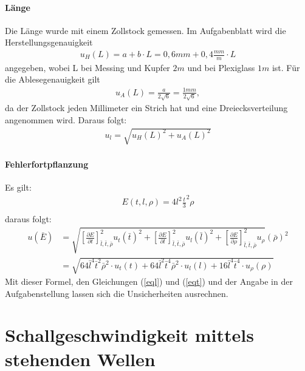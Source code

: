\documentclass[11pt, a4paper]{article}
\begin{document}
    \paragraph{Länge}
    Die Länge wurde mit einem Zollstock gemessen. Im Aufgabenblatt wird die Herstellungsgenauigkeit
    \begin{align}
        u_H(L) = a+b \cdot L = 0,6mm + 0,4\frac{mm}{m} \cdot L
    \end{align}
    angegeben, wobei L bei Messing und Kupfer $2m$ und bei Plexiglass $1m$ ist.
    Für die Ablesegenauigkeit gilt
    \begin{align}
        u_A(L) = \frac{a}{2\sqrt{6}} = \frac{1mm}{2\sqrt{6}},
    \end{align}
    da der Zollstock jeden Millimeter ein Strich hat und eine Dreiecksverteilung angenommen wird.
    Daraus folgt:
    \begin{align} \label{eql}
        u_l = \sqrt{u_H(L)^2 + u_A(L)^2}
    \end{align}

    \paragraph{Fehlerfortpflanzung}
    Es gilt:
    \begin{align}
        E(t, l, \rho ) = 4l^2 \frac{t}{3}^2 \rho \\
    \end{align}
    daraus folgt:
    \begin{align}
        u(\bar{E}) &= \sqrt{\left[\frac{\partial E}{\partial t}\right]^2_{\bar{l}, \bar{t}, \bar{\rho}} u_{t}(\bar{t})^2 +
        \left[\frac{\partial E}{\partial l}\right]^2_{\bar{l}, \bar{t}, \bar{\rho}} u_{l}(\bar{l})^2 +
        \left[\frac{\partial E}{\partial \rho}\right]^2_{\bar{l}, \bar{t}, \bar{\rho}} u_{\rho}}(\bar{\rho})^2 \nonumber \\
        &= \sqrt{64 \bar{l}^4\bar{t}^2 \bar{\rho}^2 \cdot u_t(t) +
        64 \bar{l}^2 \bar{t}^4 \bar{\rho}^2 \cdot u_l(l) +
        16 \bar{l}^4\bar{t}^4 \cdot u_{\rho}(\rho)
        } \nonumber
    \end{align}
    Mit dieser Formel, den Gleichungen (\ref{eql}) und (\ref{eqt}) und der Angabe in der Aufgabenstellung lassen
    sich die Unsicherheiten ausrechnen.

    \section{Schallgeschwindigkeit mittels stehenden Wellen}
\end{document}
